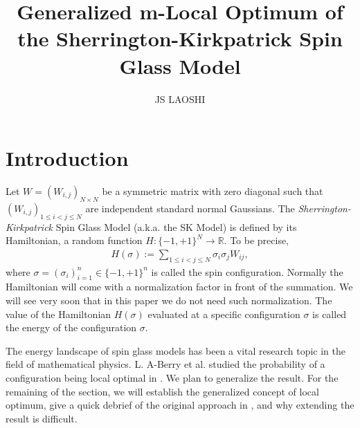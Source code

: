\documentclass[10pt]{article}
\author{JS LAOSHI}
\newenvironment{Proof of lemma}{\noindent{\bf Proof of Lemma}}{\hfill$\Box$\newline}
\newenvironment{Proof of claim}{\noindent{\bf Proof of claim}}{\hfill$\Box$\newline}
\newenvironment{Proof of theorem}{\noindent{\bf Proof of Theorem}}{\hfill\scriptsize{$\Box$}\newline}
\newenvironment{Proof of theorems}{\noindent{\bf Proof of Theorems}}{\hfill$\Box$\newline}
\newenvironment{Proof of proposition}{\noindent{\bf Proof of Proposition}}{\hfill$\Box$\newline}
\newenvironment{Proof of propositions}{\noindent{\bf Proof of Propositions}}{\hfill$\Box$\newline}
\newenvironment{Proof of exercise}{\noindent{\it Proof of Exercise:}}{\hfill$\Box$}
\numberwithin{equation}{section}
\begin{document}
\title{Generalized m-Local Optimum of the Sherrington-Kirkpatrick Spin Glass Model}
\maketitle

\section{Introduction} \label{sec_intro}
Let $W = (W_{i,j})_{N\times N}$ be a symmetric matrix with zero diagonal such that $(W_{i,j})_{1 \leq i < j \leq N}$ are independent standard normal Gaussians. The \textit{Sherrington-Kirkpatrick} Spin Glass Model (a.k.a. the SK Model) is defined by its Hamiltonian, a random function $H:\{-1,+1\}^N \to \mathbb{R}$. To be precise,
\begin{align}
    H(\sigma) := \sum_{1 \leq i < j \leq N} \sigma_i \sigma_j W_{ij},
\end{align}
where $\sigma = (\sigma_i)^n_{i=1} \in \{-1,+1\}^n$ is called the spin configuration. Normally the Hamiltonian will come with a normalization factor in front of the summation. We will see very soon that in this paper we do not need such normalization. The value of the Hamiltonian $H(\sigma)$ evaluated at a specific configuration $\sigma$ is called the energy of the configuration $\sigma$.

The energy landscape of spin glass models has been a vital research topic in the field of mathematical physics. L. A-Berry et al. studied the probability of a configuration being local optimal in \cite{SK_optimal}. We plan to generalize the result. For the remaining of the section, we will establish the generalized concept of local optimum, give a quick debrief of the original approach in \cite{SK_optimal}, and why extending the result is difficult.
\end{document}
